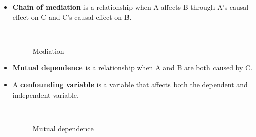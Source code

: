\begin{itemize}

\item \textbf{Chain of mediation} is a relationship when A affects B through A's causal effect on C and C's causal effect on B.

\begin{figure}[htp]\centering
\caption{Mediation}\
\end{figure}

\item \textbf{Mutual dependence} is a relationship when A and B are both caused by C.

\item A \textbf{confounding variable} is a variable that affects both the dependent and independent variable.

\begin{figure}[htp]\centering
\caption{Mutual dependence}\
\end{figure}


\end{itemize}
